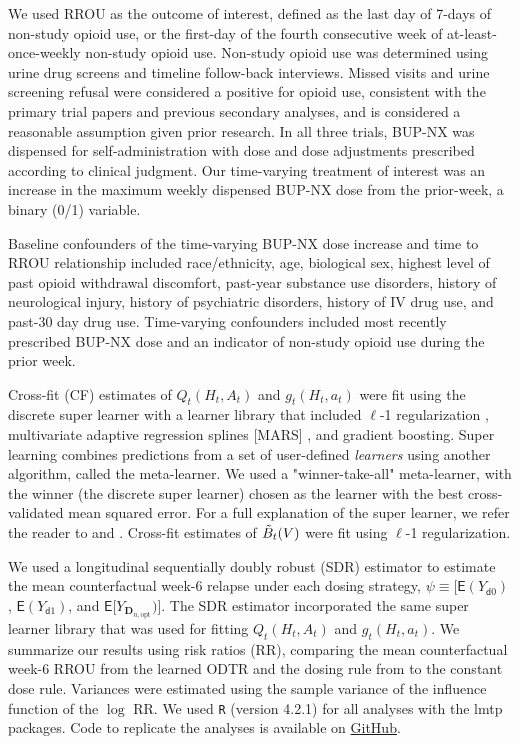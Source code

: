 \documentclass[11pt]{article}
\renewcommand{\d}{\mathsf{d}}
\newcommand{\E}{\mathsf{E}}
\theoremstyle{example}
\begin{document}
We used RROU as the outcome of interest, defined as the last day of 7-days of non-study opioid use, or the first-day of the fourth consecutive week of at-least-once-weekly non-study opioid use. Non-study opioid use was determined using urine drug screens and timeline follow-back interviews. Missed visits and urine screening refusal were considered a positive for opioid use, consistent with the primary trial papers and previous secondary analyses, \citep{lee2018comparative,weiss2011adjunctive,potter2013buprenorphine,rudolph2022dose,rudolph2022optimally} and is considered a reasonable assumption given prior research. In all three trials, BUP-NX was dispensed for self-administration with dose and dose adjustments prescribed according to clinical judgment. Our time-varying treatment of interest was an increase in the maximum weekly dispensed BUP-NX dose from the prior-week, a binary (0/1) variable. \citep{rudolph2022dose} 

Baseline confounders of the time-varying BUP-NX dose increase and time to RROU relationship included race/ethnicity, age, biological sex, highest level of past opioid withdrawal discomfort, past-year substance use disorders, history of neurological injury, history of psychiatric disorders, history of IV drug use, and past-30 day drug use. Time-varying confounders included most recently prescribed BUP-NX dose and an indicator of non-study opioid use during the prior week.

Cross-fit (CF) estimates of $Q_t(H_t, A_t)$ and $g_t(H_t, a_t)$ were fit using the discrete super learner \cite{van2007super} with a learner library that included $\ell$-1 regularization \cite{tibshirani1996regression}, multivariate adaptive regression splines [MARS] \cite{friedman1991multivariate}, and gradient boosting.\cite{lightgbm} Super learning combines predictions from a set of user-defined \textit{learners} using another algorithm, called the meta-learner. \citep{breimanStacked,van2007super} We used a "winner-take-all" meta-learner, with the winner (the discrete super learner) chosen as the learner with the best cross-validated mean squared error. For a full explanation of the super learner, we refer the reader to \citet{van2007super} and \citet{phillips2023practical}. Cross-fit estimates of $\Tilde{B}_t(V)$ were fit using $\ell$-1 regularization. 

We used a longitudinal sequentially doubly robust \citep{luedtke2018sequential} (SDR) estimator to estimate the mean counterfactual week-6 relapse under each dosing strategy, $\psi \equiv [\E(Y_{\d0})$, $\E(Y_{\d1})$, and $\E[Y_{\textbf{D}_{n, \text{opt}}})$]. The SDR estimator incorporated the same super learner library that was used for fitting $Q_t(H_t, A_t)$ and $g_t(H_t, a_t)$. We summarize our results using risk ratios (RR), comparing the mean counterfactual week-6 RROU from the learned ODTR and the dosing rule from \citet{rudolph2022dose} to the constant dose rule. Variances were estimated using the sample variance of the influence function of the $\log$ RR.  \cite{luedtke2018sequential} We used \texttt{R}\cite{R} (version 4.2.1) for all analyses with the lmtp \cite{lmtpR, lmtpJASA} packages. Code to replicate the analyses is available on \href{https://github.com/Rudolph-et-al-MSPH-Epidemiology/odtr}{GitHub}.
\end{document}
